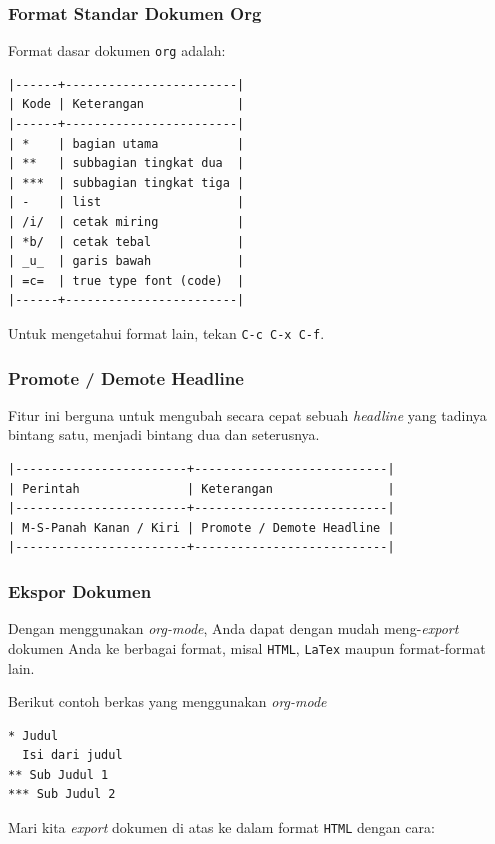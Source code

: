 \documentclass{article}
\begin{document}
\subsubsection{Format Standar Dokumen Org}

Format dasar dokumen \verb=org= adalah:

\begin{verbatim}
|------+------------------------|
| Kode | Keterangan             |
|------+------------------------|
| *    | bagian utama           |
| **   | subbagian tingkat dua  |
| ***  | subbagian tingkat tiga |
| -    | list                   |
| /i/  | cetak miring           |
| *b/  | cetak tebal            |
| _u_  | garis bawah            |
| =c=  | true type font (code)  |
|------+------------------------|
\end{verbatim}

Untuk mengetahui format lain, tekan \texttt{C-c C-x C-f}.

\subsubsection{Promote / Demote Headline}
Fitur ini berguna untuk mengubah secara cepat sebuah \emph{headline} yang
tadinya bintang satu, menjadi bintang dua dan seterusnya.

\begin{verbatim}
|------------------------+---------------------------|
| Perintah               | Keterangan                |
|------------------------+---------------------------|
| M-S-Panah Kanan / Kiri | Promote / Demote Headline |
|------------------------+---------------------------|
\end{verbatim}

\subsubsection{Ekspor Dokumen}
Dengan menggunakan \emph{org-mode}, Anda dapat dengan mudah meng-\emph{export}
dokumen Anda ke berbagai format, misal \verb=HTML=, \verb=LaTex= maupun 
format-format lain.

Berikut contoh berkas yang menggunakan \emph{org-mode}

\begin{verbatim}
* Judul
  Isi dari judul
** Sub Judul 1
*** Sub Judul 2
\end{verbatim}

Mari kita \emph{export} dokumen di atas ke dalam format \verb=HTML= dengan cara:
\end{document}
